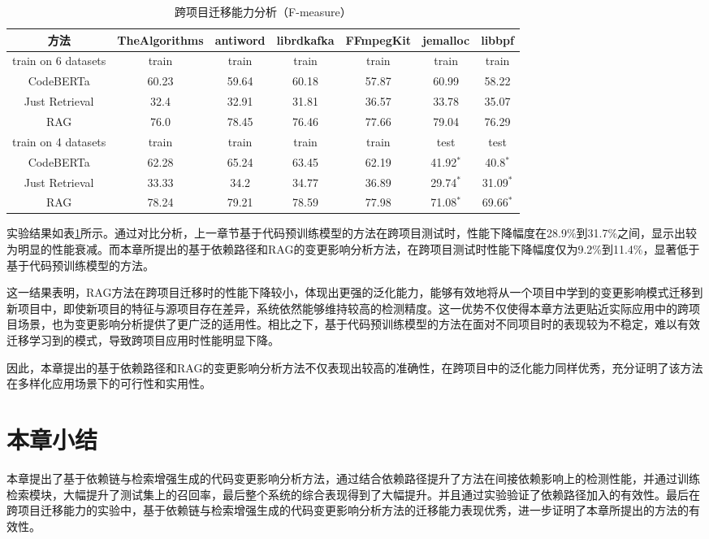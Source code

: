 \begin{table}[htbp]
\caption{跨项目迁移能力分析（F-measure）}
\label{2_跨项目迁移能力分析}
\vspace{0.5em}\centering\wuhao
\begin{tabular}{c|cccc|cc}
\toprule
方法& TheAlgorithms & antiword & librdkafka & FFmpegKit & jemalloc & libbpf\\
\midrule
train on 6 datasets & train &train &train &train &train &train \\
\midrule
CodeBERTa  &  60.23 & 59.64 & 60.18 & 57.87 & 60.99 & 58.22 \\
Just Retrieval   & 32.4 & 32.91 & 31.81 & 36.57 & 33.78 & 35.07  \\
RAG & 76.0 & 78.45 & 76.46 & 77.66 & 79.04 & 76.29  \\
\midrule
train on 4 datasets & train &train &train &train &test &test\\
\midrule
CodeBERTa  &  62.28 & 65.24 & 63.45 & 62.19 & 41.92$^*$ & 40.8$^*$\\
Just Retrieval   & 33.33 & 34.2 & 34.77 & 36.89 & 29.74$^*$ & 31.09$^*$ \\
RAG & 78.24 & 79.21 & 78.59 & 77.98 & 71.08$^*$ & 69.66$^*$ \\
\bottomrule
\end{tabular}
\end{table}

实验结果如表\ref{2_跨项目迁移能力分析}所示。通过对比分析，上一章节基于代码预训练模型的方法在跨项目测试时，性能下降幅度在28.9\%到31.7\%之间，显示出较为明显的性能衰减。而本章所提出的基于依赖路径和RAG的变更影响分析方法，在跨项目测试时性能下降幅度仅为9.2\%到11.4\%，显著低于基于代码预训练模型的方法。

这一结果表明，RAG方法在跨项目迁移时的性能下降较小，体现出更强的泛化能力，能够有效地将从一个项目中学到的变更影响模式迁移到新项目中，即使新项目的特征与源项目存在差异，系统依然能够维持较高的检测精度。这一优势不仅使得本章方法更贴近实际应用中的跨项目场景，也为变更影响分析提供了更广泛的适用性。相比之下，基于代码预训练模型的方法在面对不同项目时的表现较为不稳定，难以有效迁移学习到的模式，导致跨项目应用时性能明显下降。



因此，本章提出的基于依赖路径和RAG的变更影响分析方法不仅表现出较高的准确性，在跨项目中的泛化能力同样优秀，充分证明了该方法在多样化应用场景下的可行性和实用性。
 

\section{本章小结}

本章提出了基于依赖链与检索增强生成的代码变更影响分析方法，通过结合依赖路径提升了方法在间接依赖影响上的检测性能，并通过训练检索模块，大幅提升了测试集上的召回率，最后整个系统的综合表现得到了大幅提升。并且通过实验验证了依赖路径加入的有效性。最后在跨项目迁移能力的实验中，基于依赖链与检索增强生成的代码变更影响分析方法的迁移能力表现优秀，进一步证明了本章所提出的方法的有效性。

